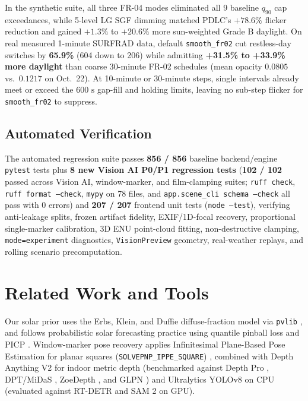 \documentclass[conference]{IEEEtran}
\begin{document}
In the synthetic suite, all three FR-04 modes eliminated all 9 baseline $q_{90}$ cap exceedances, while 5-level LG SGF dimming matched PDLC's $+78.6\%$ flicker reduction and gained $+1.3\%$ to $+20.6\%$ more sun-weighted Grade B daylight. On real measured 1-minute SURFRAD data, default \texttt{smooth\_fr02} cut restless-day switches by \textbf{65.9\%} (604 down to 206) while admitting \textbf{+31.5\% to +33.9\% more daylight} than coarse 30-minute FR-02 schedules (mean opacity $0.0805$ vs.\ $0.1217$ on Oct.~22). At 10-minute or 30-minute steps, single intervals already meet or exceed the $600\text{ s}$ gap-fill and holding limits, leaving no sub-step flicker for \texttt{smooth\_fr02} to suppress.

\subsection{Automated Verification}
The automated regression suite passes \textbf{856 / 856} baseline backend/engine \texttt{pytest} tests plus \textbf{8 new Vision AI P0/P1 regression tests} (\textbf{102 / 102} passed across Vision AI, window-marker, and film-clamping suites; \texttt{ruff check}, \texttt{ruff format --check}, \texttt{mypy} on 78 files, and \texttt{app.scene\_cli schema --check} all pass with 0 errors) and \textbf{207 / 207} frontend unit tests (\texttt{node --test}), verifying anti-leakage splits, frozen artifact fidelity, EXIF/1D-focal recovery, proportional single-marker calibration, 3D ENU point-cloud fitting, non-destructive clamping, \texttt{mode=experiment} diagnostics, \texttt{VisionPreview} geometry, real-weather replays, and rolling scenario precomputation.

\section{Related Work and Tools}

Our solar prior uses the Erbs, Klein, and Duffie diffuse-fraction model \cite{b1} via \texttt{pvlib} \cite{b4}, and follows probabilistic solar forecasting practice using quantile pinball loss and PICP \cite{b2,b3}. Window-marker pose recovery applies Infinitesimal Plane-Based Pose Estimation for planar squares (\texttt{SOLVEPNP\_IPPE\_SQUARE}) \cite{b5}, combined with Depth Anything V2 \cite{b6} for indoor metric depth (benchmarked against Depth Pro \cite{b11}, DPT/MiDaS \cite{b12}, ZoeDepth \cite{b13}, and GLPN \cite{b14}) and Ultralytics YOLOv8 \cite{b7} on CPU (evaluated against RT-DETR \cite{b15} and SAM 2 \cite{b16} on GPU).
\end{document}
